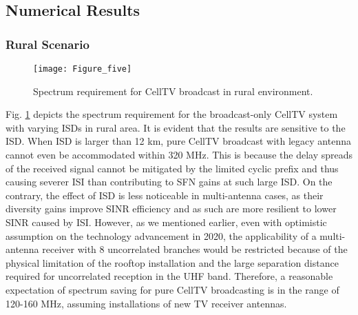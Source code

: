 \documentclass[journal]{IEEEtran}
\begin{document}
\subsection{Numerical Results }
\subsubsection{\textbf{Rural Scenario}}
  \begin{figure}[t]
  \centering
  \texttt{[image: Figure\_five]}\\
  \caption{Spectrum requirement for CellTV broadcast in rural environment.}\label{fig:Broad_rural}
\end{figure}
Fig. \ref{fig:Broad_rural} depicts the spectrum requirement for the broadcast-only CellTV system with varying ISDs in rural area. It is evident that the results are sensitive to the ISD. When ISD is larger than 12 km, pure CellTV broadcast with legacy antenna cannot even be accommodated within 320 MHz. This is because the delay spreads of the received signal cannot be mitigated by the limited cyclic prefix and thus causing severer ISI than contributing to SFN gains at such large ISD. On the contrary, the effect of ISD is less noticeable in multi-antenna cases, as their diversity gains improve SINR efficiency and as such are more resilient to lower SINR caused by ISI. However, as we mentioned earlier, even with optimistic assumption on the technology advancement in 2020, the applicability of a multi-antenna receiver with 8 uncorrelated branches would be restricted because of the physical limitation of the rooftop installation and the large separation distance required for uncorrelated reception in the UHF band. Therefore, a reasonable expectation of spectrum saving for pure CellTV broadcasting is in the range of 120-160 MHz, assuming installations of new TV receiver antennas.
\end{document}
